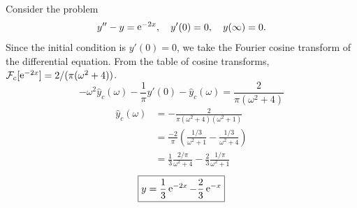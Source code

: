 \begin{Example}
  Consider the problem
  \[ 
  y'' - y = \mathop{\mathrm{e}}\nolimits^{-2 x}, \quad y'(0) = 0, \quad y(\infty) = 0. 
  \]
  Since the initial condition is $y'(0) = 0$,
  we take the Fourier cosine transform of the differential equation. From the
  table of cosine transforms, $\mathcal{F}_c[\mathop{\mathrm{e}}\nolimits^{-2x}] = 2/(\pi (\omega^2+4))$.
  \[ 
  -\omega^2 \hat{y}_c(\omega) - \frac{1}{\pi} y'(0) - \hat{y}_c(\omega) 
  = \frac{2}{\pi (\omega^2 + 4)} 
  \] 
  \begin{align*}
    \hat{y}_c(\omega) &= - \frac{2}{\pi (\omega^2+4)(\omega^2+1)} 
    \\
    &= \frac{-2}{\pi} \left( \frac{1/3}{\omega^2 + 1} - \frac{1/3}{\omega^2 + 4} \right) 
    \\
    &= \frac{1}{3} \frac{2/\pi}{\omega^2 + 4} - \frac{2}{3} \frac{1/\pi}{\omega^2 + 1}
  \end{align*}
  \[ 
  \boxed{ 
    y = \frac{1}{3} \mathop{\mathrm{e}}\nolimits^{-2x} - \frac{2}{3} \mathop{\mathrm{e}}\nolimits^{-x}
    } 
  \]
\end{Example}



















